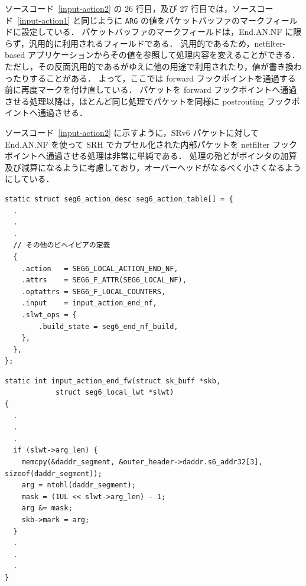 ソースコード~\ref*{input-action2} の 26 行目，及び 27 行目では，ソースコード~\ref*{input-action1} と同じように \texttt{ARG} の値をパケットバッファのマークフィールドに設定している．
パケットバッファのマークフィールドは，End.AN.NF に限らず，汎用的に利用されるフィールドである．
汎用的であるため，netfilter-based アプリケーションからその値を参照して処理内容を変えることができる．
ただし，その反面汎用的であるがゆえに他の用途で利用されたり，値が書き換わったりすることがある．
よって，ここでは forward フックポイントを通過する前に再度マークを付け直している．
パケットを forward フックポイントへ通過させる処理以降は，ほとんど同じ処理でパケットを同様に postrouting フックポイントへ通過させる．

ソースコード~\ref*{input-action2} に示すように，SRv6 パケットに対して End.AN.NF を使って SRH でカプセル化された内部パケットを netfilter フックポイントへ通過させる処理は非常に単純である．
処理の殆どがポインタの加算及び減算になるように考慮しており，オーバーヘッドがなるべく小さくなるようにしている．


\begin{lstlisting}[caption=Add definition of End.AN.NF to seg6\_action\_table,label=seg6-action-desc]
static struct seg6_action_desc seg6_action_table[] = {
  .
  .
  .
  // その他のビヘイビアの定義
  {
    .action   = SEG6_LOCAL_ACTION_END_NF,
    .attrs    = SEG6_F_ATTR(SEG6_LOCAL_NF),
    .optattrs = SEG6_F_LOCAL_COUNTERS,
    .input    = input_action_end_nf,
    .slwt_ops = {
        .build_state = seg6_end_nf_build,
    },
  },
};
\end{lstlisting}

\begin{lstlisting}[caption=Set a mark to a packet buffer,label=input-action1]
static int input_action_end_fw(struct sk_buff *skb,
  			struct seg6_local_lwt *slwt)
{
  .
  .
  .
  if (slwt->arg_len) {
    memcpy(&daddr_segment, &outer_header->daddr.s6_addr32[3], sizeof(daddr_segment));
    arg = ntohl(daddr_segment);
    mask = (1UL << slwt->arg_len) - 1;
    arg &= mask;
    skb->mark = arg;
  }
  .
  .
  .
}
\end{lstlisting}

